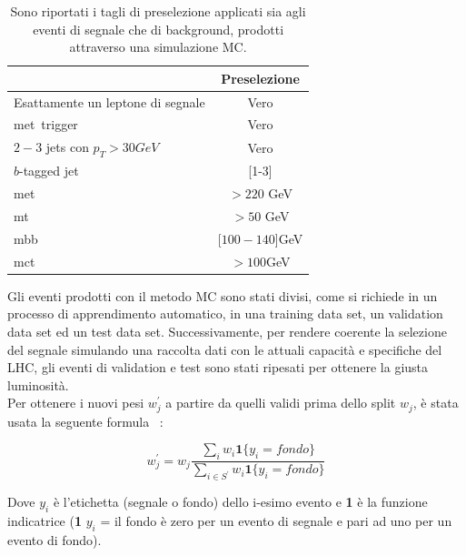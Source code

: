 \begin{table}[h!]
	\centering
	\begin{tabular}{lc}
		\hline
		&Preselezione \\
		\hline
		Esattamente un leptone di segnale&Vero\\
		met\ trigger&Vero\\
		$2-3$ jets con $p_{T}>30 GeV$&Vero\\
		$b$-tagged jet&[1-3]\\
		met\ &$> 220$ GeV\\
		mt\ &$> 50$ GeV\\
		mbb\ &[$100-140$]GeV\\
		mct\ &$>100$GeV\\
		\hline
	\end{tabular}
	\caption{Sono riportati i tagli di preselezione applicati sia agli eventi di segnale che di background, prodotti attraverso una simulazione MC.}
	\label{tab:tagli di preselezione}
\end{table} 
Gli eventi prodotti con il metodo MC sono stati divisi, come si richiede in un processo di apprendimento automatico, in una training data set, un validation data set ed un test data set. Successivamente, per rendere coerente la selezione del segnale simulando una raccolta dati con le attuali capacità e specifiche del LHC, gli eventi di validation e test sono stati ripesati per ottenere la giusta luminosità.\\
Per ottenere i nuovi pesi $w_{j}^{'}$ a partire da quelli validi prima dello split $w_{j}$, è stata usata la seguente formula ~\cite{HiggsChalllenge}:

\begin{equation}
	\label{eq:ripesaggio}
    w_j^{'}=  w_{j}\frac{\sum_{i} w_{i} \textbf{1} \lbrace y_{i}=fondo\rbrace }{\sum_{i\in S^{'}}w_{i} \textbf{1} \lbrace y_{i}=fondo\rbrace }  
\end{equation}

Dove $y_{i}$ è l'etichetta (segnale o fondo) dello i-esimo evento e \textbf{1} è la funzione indicatrice (\textbf{1} {$y_{i}$ = il fondo} è zero per un evento di segnale e pari ad uno per un evento di fondo).

\newpage


